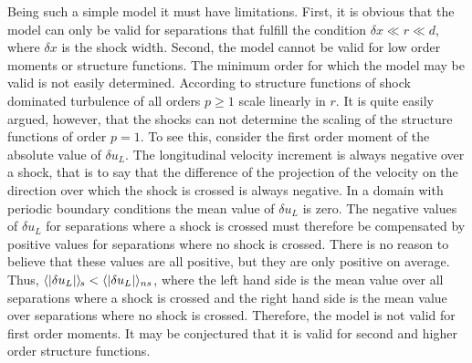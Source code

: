 Being such a simple model it must have limitations. First, it is obvious that
the model can only be valid for separations that fulfill the condition $ \delta
x \ll r \ll d $, where $ \delta x $ is the shock width. Second, the model
cannot be valid for low order moments or structure functions. The minimum order
for which the model may be valid is not easily determined. According to
\cite{BouchaudMezardParisi1995} structure functions of shock dominated
turbulence of all orders $ p \ge 1 $ scale linearly in $ r $. It is quite
easily argued, however, that the shocks can not determine the scaling of the
structure functions of order $ p=1 $. To see this, consider the first order
moment of the absolute value of $ \delta u_L $. The longitudinal velocity
increment is always negative over a shock, that is to say that the difference
of the projection of the velocity on the direction over which the shock is
crossed is always negative. In a domain with periodic boundary conditions the
mean value of $ \delta u_L $ is zero. The negative values of $ \delta u_L $ for
separations where a shock is crossed must therefore be compensated by positive
values for separations where no shock is crossed. There is no reason to believe
that these values are all positive, but they are only positive on average.
Thus, $ {\langle  |\delta u_L |  \rangle_{\hspace{-0.4mm}s}} < \langle | \delta u_L | \rangle _{ns} $, where
the left hand side is the mean value over all separations where a shock is
crossed and the right hand side is the mean value over separations where no
shock is crossed. Therefore, the model is not valid for first order moments. It
may be conjectured that it is valid for second and higher order structure
functions.
